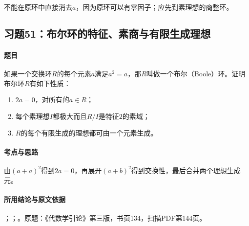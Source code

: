 不能在原环中直接消去$a$，因为原环可以有零因子；应先到素理想的商整环。



\subsection{习题51：布尔环的特征、素商与有限生成理想}

\label{ex:3:51}

\paragraph{题目}

如果一个交换环$R$的每个元素$a$满足$a^2=a$，那$R$叫做一个布尔（Boole）环。证明布尔环$R$有如下性质：
\begin{enumerate}[label=(\roman*)]
\item $2a=0$，对所有的$a\in R$；
\item 每个素理想$I$都极大而且$R/I$是特征$2$的素域；
\item $R$的每个有限生成的理想都可由一个元素生成。
\end{enumerate}

\paragraph{考点与思路}

由$(a+a)^2$得到$2a=0$，再展开$(a+b)^2$得到交换性，最后合并两个理想生成元。

\paragraph{所用结论与原文依据}

；；。原题：《代数学引论》第三版，书页134，扫描PDF第144页。


